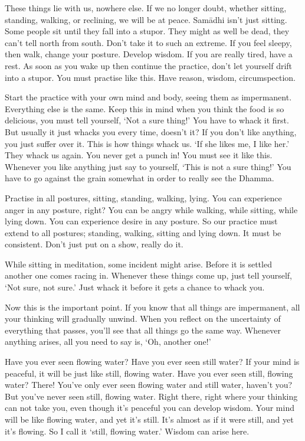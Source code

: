 These things lie with us, nowhere else. If we no longer doubt, whether sitting, standing, walking, or reclining, we will be at peace. Sam\=adhi isn't just sitting. Some people sit until they fall into a stupor. They might as well be dead, they can't tell north from south. Don't take it to such an extreme. If you feel sleepy, then walk, change your posture. Develop wisdom. If you are really tired, have a rest. As soon as you wake up then continue the practice, don't let yourself drift into a stupor. You must practise like this. Have reason, wisdom, circumspection.

Start the practice with your own mind and body, seeing them as impermanent. Everything else is the same. Keep this in mind when you think the food is so delicious, you must tell yourself, `Not a sure thing!' You have to whack it first. But usually it just whacks you every time, doesn't it? If you don't like anything, you just suffer over it. This is how things whack us. `If she likes me, I like her.' They whack us again.  You never get a punch in! You must see it like this. Whenever you like anything just say to yourself, `This is not a sure thing!' You have to go against the grain somewhat in order to really see the Dhamma.

Practise in all postures, sitting, standing, walking, lying. You can experience anger in any posture, right? You can be angry while walking, while sitting, while lying down. You can experience desire in any posture. So our practice must extend to all postures; standing, walking, sitting and lying down. It must be consistent. Don't just put on a show, really do it.

While sitting in meditation, some incident might arise. Before it is settled another one comes racing in. Whenever these things come up, just tell yourself, `Not sure, not sure.' Just whack it before it gets a chance to whack you.

Now this is the important point. If you know that all things are impermanent, all your thinking will gradually unwind. When you reflect on the uncertainty of everything that passes, you'll see that all things go the same way. Whenever anything arises, all you need to say is, `Oh, another one!'

Have you ever seen flowing water? Have you ever seen still water? If your mind is peaceful, it will be just like still, flowing water. Have you ever seen still, flowing water? There! You've only ever seen flowing water and still water, haven't you? But you've never seen still, flowing water. Right there, right where your thinking can not take you, even though it's peaceful you can develop wisdom. Your mind will be like flowing water, and yet it's still. It's almost as if it were still, and yet it's flowing. So I call it `still, flowing water.' Wisdom can arise here.
